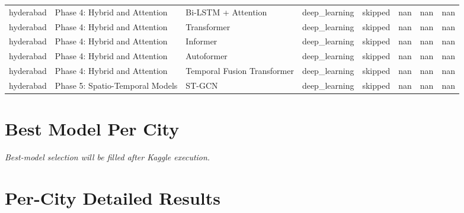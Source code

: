 \documentclass[11pt,a4paper,oneside]{book}
\begin{document}
\begin{longtable}{@{}lllllrrr@{}}
hyderabad & Phase 4: Hybrid and Attention & Bi-LSTM + Attention & deep\_learning & skipped & nan & nan & nan \\
hyderabad & Phase 4: Hybrid and Attention & Transformer & deep\_learning & skipped & nan & nan & nan \\
hyderabad & Phase 4: Hybrid and Attention & Informer & deep\_learning & skipped & nan & nan & nan \\
hyderabad & Phase 4: Hybrid and Attention & Autoformer & deep\_learning & skipped & nan & nan & nan \\
hyderabad & Phase 4: Hybrid and Attention & Temporal Fusion Transformer & deep\_learning & skipped & nan & nan & nan \\
hyderabad & Phase 5: Spatio-Temporal Models & ST-GCN & deep\_learning & skipped & nan & nan & nan \\
\bottomrule
\end{longtable}

\chapter{Best Model Per City}
\textit{Best-model selection will be filled after Kaggle execution.}

\chapter{Per-City Detailed Results}
\end{document}
